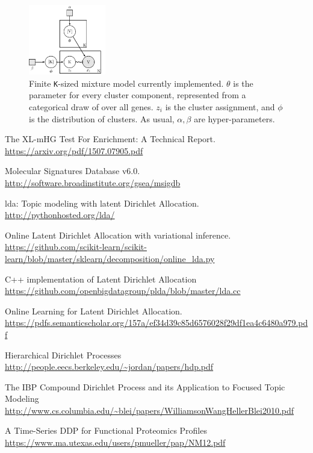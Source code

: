 \documentclass[11pt]{article}
\begin{document}
\begin{figure}
    \centering
    \includegraphics[width=0.3\textwidth]{mixture}
    \caption{Finite \texttt{K}-sized mixture model currently implemented. $\theta$ is the parameter for every cluster component, represented from a categorical draw of over all genes. $z_i$ is the cluster assignment, and $\phi$ is the distribution of clusters. As usual, $\alpha, \beta$ are hyper-parameters.}
    \label{fig:plate}
\end{figure}

\begin{thebibliography}{9}
        The XL-mHG Test For Enrichment: A Technical Report.
        \url{https://arxiv.org/pdf/1507.07905.pdf}
         
        Molecular Signatures Database v6.0.
        \url{http://software.broadinstitute.org/gsea/msigdb}
         
        lda: Topic modeling with latent Dirichlet Allocation.
        \url{http://pythonhosted.org/lda/}

        Online Latent Dirichlet Allocation with variational inference.
        \url{https://github.com/scikit-learn/scikit-learn/blob/master/sklearn/decomposition/online_lda.py}

        C++ implementation of Latent Dirichlet Allocation
        \url{https://github.com/openbigdatagroup/plda/blob/master/lda.cc}

        Online Learning for Latent Dirichlet Allocation.
        \url{https://pdfs.semanticscholar.org/157a/ef34d39c85d6576028f29df1ea4c6480a979.pdf}

        Hierarchical Dirichlet Processes
        \url{http://people.eecs.berkeley.edu/~jordan/papers/hdp.pdf}

        The IBP Compound Dirichlet Process and its Application to Focused Topic Modeling
        \url{http://www.cs.columbia.edu/~blei/papers/WilliamsonWangHellerBlei2010.pdf}

        A Time-Series DDP for Functional Proteomics Profiles
        \url{https://www.ma.utexas.edu/users/pmueller/pap/NM12.pdf}


\end{thebibliography}
\end{document}
